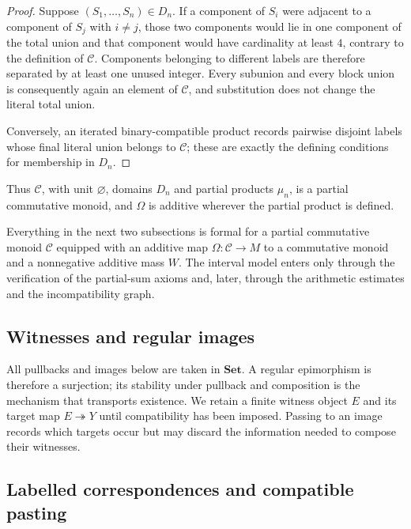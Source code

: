 \begin{proof}
Suppose $(S_1,\ldots,S_n)\in D_n$.  If a component of $S_i$ were adjacent to a component of $S_j$ with $i\ne j$, those two components would lie in one component of the total union and that component would have cardinality at least $4$, contrary to the definition of $\mathcal C$.  Components belonging to different labels are therefore separated by at least one unused integer.  Every subunion and every block union is consequently again an element of $\mathcal C$, and substitution does not change the literal total union.

Conversely, an iterated binary-compatible product records pairwise disjoint labels whose final literal union belongs to $\mathcal C$; these are exactly the defining conditions for membership in $D_n$.
\end{proof}

Thus $\mathcal C$, with unit $\varnothing$, domains $D_n$ and partial products $\mu_n$, is a partial commutative monoid, and $\Omega$ is additive wherever the partial product is defined.

\begin{remark}\label{rem:abstract-labelled-relations}
Everything in the next two subsections is formal for a partial commutative monoid $\mathscr C$ equipped with an additive map $\Omega:\mathscr C\to M$ to a commutative monoid and a nonnegative additive mass $W$.  The interval model enters only through the verification of the partial-sum axioms and, later, through the arithmetic estimates and the incompatibility graph.
\end{remark}

\subsection{Witnesses and regular images}

All pullbacks and images below are taken in $\mathbf{Set}$.  A regular epimorphism is therefore a surjection; its stability under pullback and composition is the mechanism that transports existence.  We retain a finite witness object $E$ and its target map $E\twoheadrightarrow Y$ until compatibility has been imposed.  Passing to an image records which targets occur but may discard the information needed to compose their witnesses.

\subsection{Labelled correspondences and compatible pasting}

